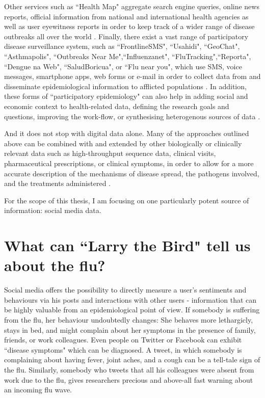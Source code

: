 \documentclass[11pt, a4paper,twoside]{report}\usepackage[]{graphicx}\usepackage[]{color}
\begin{document}
Other services such as ``Health Map" aggregate search engine queries, online news reports, official information from national and international health agencies as well as user eyewitness reports in order to keep track of a wider range of disease outbreaks all over the world \citep{brownstein_surveillance_2008,freifeld_healthmap:_2008}. Finally, there exist a vast range of participatory disease surveillance system, such as ``FrontlineSMS", ``Usahidi", ``GeoChat", ``Asthmapolis", ``Outbreaks Near Me",``Influenzanet", ``FluTracking",``Reporta", ``Dengue na Web", ``SaludBoricua", or ``Flu near you", which use SMS, voice messages, smartphone apps, web forms or e-mail in order to collect data from and disseminate epidemiological information to afflicted populations \citep{freifeld_participatory_2010,chunara_flu_2013,wojcik_public_2014,chunara_estimating_2015}. In addition, these forms of ``participatory epidemiology" can also help in adding social and economic context to health-related data, defining the research goals and questions, improving the work-flow, or synthesising heterogenous sources of data \citep{bach_participatory_2017,liu_assessing_2017}.

And it does not stop with digital data alone. Many of the approaches outlined above can be combined with and extended by other biologically or clinically relevant data such as high-throughput sequence data, clinical visits, pharmaceutical prescriptions, or clinical symptoms, in order to allow for a more accurate description of the mechanisms of disease spread, the pathogens involved, and the treatments administered \citep{ray_network_2016}.

For the scope of this thesis, I am focusing on one particularly potent source of information: social media data.

\section{What can ``Larry the Bird" tell us about the flu?}
Social media offers the possibility to directly measure a user's sentiments and behaviours via his posts and interactions with other users - information that can be highly valuable from an epidemiological point of view. If somebody is suffering from the flu, her behaviour undoubtedly changes: She behaves more lethargicly, stays in bed, and might complain about her symptoms in the presence of family, friends, or work colleagues. Even people on Twitter or Facebook can exhibit ``disease symptoms" which can be diagnosed. A tweet, in which somebody is complaining about having fever, joint aches, and a cough can be a tell-tale sign of the flu. Similarly, somebody who tweets that all his colleagues were absent from work due to the flu, gives researchers precious and above-all fast warning about an incoming flu wave.
\end{document}
